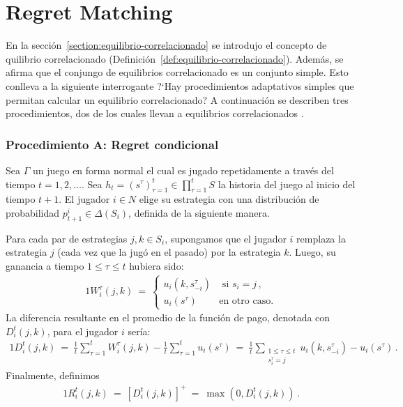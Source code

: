 \chapter{Regret Matching}
\label{chapter:regret-matching}

En la sección~\ref{section:equilibrio-correlacionado} se introdujo el concepto de quilibrio correlacionado (Definición~\ref{def:equilibrio-correlacionado}). Además, se afirma que el conjungo de equilibrios correlacionado es un conjunto simple. Esto conlleva a la siguiente interrogante ?`Hay procedimientos adaptativos simples que permitan calcular un equilibrio correlacionado? A continuación se describen tres procedimientos, dos de los cuales llevan a equilibrios correlacionados \cite{bib:correlated-equilibrium}.

\subsection*{Procedimiento A: Regret condicional}

Sea $\Gamma$ un juego en forma normal el cual es jugado repetidamente a través del tiempo $t = 1, 2, \ldots $. 
Sea $h_t = (s^\tau)_{\tau = 1}^t \in \prod_{\tau = 1}^{t} S$ la historia del juego al inicio del tiempo $t+1$. El jugador $i \in N$ elige su estrategia con una distribución de probabilidad $p_{t+1}^i \in \Delta(S_i)$, definida de la siguiente manera.

Para cada par de estrategias $j, k \in S_i$, supongamos que el jugador $i$ remplaza la estrategia $j$ (cada vez que la jugó en el pasado) por la estrategia $k$. Luego, su ganancia a tiempo $1\leq \tau \leq t$ hubiera sido:
\begin{alignat}{1}
W_i^{\tau}(j,k)\ =\ 
\begin{cases}
u_i(k, s_{-i}^{\tau}) &\text{ si } s_i = j \,, \\
u_i(s^\tau) & \text{en otro caso.} 
\end{cases}
\end{alignat}
La diferencia resultante en el promedio de la función de pago, denotada con $D_i^t(j, k)$, para el jugador $i$ sería:
\begin{alignat}{1}
  D_i^t(j, k)\ 
    =\ \frac{1}{t} \sum_{\tau = 1}^{t} W_i^{\tau}(j, k) - \frac{1}{t} \sum_{\tau = 1}^{t} u_i(s^{\tau})\ 
	=\ \frac{1}{t} \sum_{\substack{1\leq \tau \leq t \\s^\tau_i = j}} u_i(k, s_{-i}^{\tau}) - u_i(s^{\tau}) \,.
\end{alignat}
Finalmente, definimos
\begin{alignat}{1}
\label{eq:regret}
R_i^t(j, k)\ =\ [D_i^t(j, k)]^+\ =\ \max(0, D_i^t(j, k)) \,.
\end{alignat}

